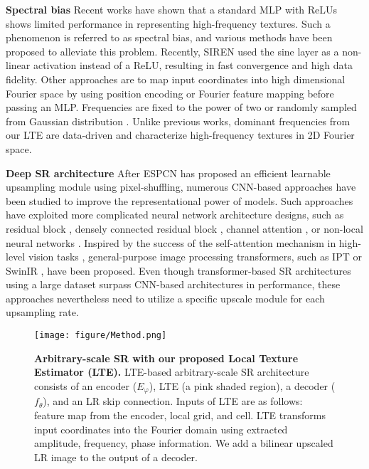 \documentclass[10pt,twocolumn,letterpaper]{article}
\begin{document}
\textbf{Spectral bias} Recent works \cite{DBLP:conf/icml/RahamanBADLHBC19, sitzmann2019siren, mildenhall2020nerf, tancik2020fourfeat} have shown that a standard MLP with ReLUs shows limited performance in representing high-frequency textures. Such a phenomenon is referred to as spectral bias, and various methods have been proposed to alleviate this problem. Recently, SIREN \cite{sitzmann2019siren} used the sine layer as a non-linear activation instead of a ReLU, resulting in fast convergence and high data fidelity. Other approaches \cite{mildenhall2020nerf, tancik2020fourfeat} are to map input coordinates into high dimensional Fourier space by using position encoding or Fourier feature mapping before passing an MLP. Frequencies are fixed to the power of two \cite{mildenhall2020nerf} or randomly sampled from Gaussian distribution \cite{tancik2020fourfeat}. Unlike previous works, dominant frequencies from our LTE are data-driven and characterize high-frequency textures in 2D Fourier space.

{\bf Deep SR architecture} After ESPCN \cite{DBLP:journals/corr/ShiCHTABRW16} has proposed an efficient learnable upsampling module using pixel-shuffling, numerous CNN-based approaches \cite{Lim_2017_CVPR_Workshops, zhang2018rcan, zhang2018residual, dai2019second, Mei_2021_CVPR} have been studied to improve the representational power of models. Such approaches have exploited more complicated neural network architecture designs, such as residual block \cite{Lim_2017_CVPR_Workshops}, densely connected residual block \cite{zhang2018residual}, channel attention \cite{zhang2018rcan, dai2019second}, or non-local neural networks \cite{Mei_2021_CVPR}. Inspired by the success of the self-attention mechanism in high-level vision tasks \cite{DBLP:conf/iclr/DosovitskiyB0WZ21, liu2021swin}, general-purpose image processing transformers, such as IPT \cite{DBLP:conf/cvpr/Chen000DLMX0021} or SwinIR \cite{liang2021swinir}, have been proposed. Even though transformer-based SR architectures using a large dataset surpass CNN-based architectures in performance, these approaches nevertheless need to utilize a specific upscale module for each upsampling rate.

\begin{figure*}[t]
\centering
\texttt{[image: figure/Method.png]}
\caption{\textbf{Arbitrary-scale SR with our proposed Local Texture Estimator (LTE).} LTE-based arbitrary-scale SR architecture consists of an encoder ($E_\varphi$), LTE (a pink shaded region), a decoder ($f_\theta$), and an LR skip connection. Inputs of LTE are as follows: feature map from the encoder, local grid, and cell. LTE transforms input coordinates into the Fourier domain using extracted amplitude, frequency, phase information. We add a bilinear upscaled LR image to the output of a decoder.}
\label{fig:flowchart}
\end{figure*}
\end{document}
